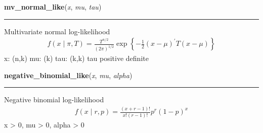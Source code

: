 \hspace{.8\funcindent}\begin{boxedminipage}{\funcwidth}

    \raggedright \textbf{mv\_normal\_like}(\textit{x}, \textit{mu}, \textit{tau})

    \vspace{-1.5ex}

    \rule{\textwidth}{0.5\fboxrule}
\setlength{\parskip}{2ex}

Multivariate normal log-likelihood
\begin{equation*}\begin{split}f(x \mid \pi, T) = \frac{T^{n/2}}{(2\pi)^{1/2}} \exp\left\{ -\frac{1}{2} (x-\mu)^{\prime}T(x-\mu) \right\}\end{split}\end{equation*}
x: (n,k)
mu: (k)
tau: (k,k)
tau positive definite
\setlength{\parskip}{1ex}
    \end{boxedminipage}

    \label{pymc:distributions:negative_binomial_like}

    \vspace{0.5ex}

\hspace{.8\funcindent}\begin{boxedminipage}{\funcwidth}

    \raggedright \textbf{negative\_binomial\_like}(\textit{x}, \textit{mu}, \textit{alpha})

    \vspace{-1.5ex}

    \rule{\textwidth}{0.5\fboxrule}
\setlength{\parskip}{2ex}

Negative binomial log-likelihood
\begin{equation*}\begin{split}f(x \mid r, p) = \frac{(x+r-1)!}{x! (r-1)!} p^r (1-p)^x\end{split}\end{equation*}
x {\textgreater} 0, mu {\textgreater} 0, alpha {\textgreater} 0
\setlength{\parskip}{1ex}
    \end{boxedminipage}

    \label{pymc:distributions:normal_like}

    \vspace{0.5ex}

